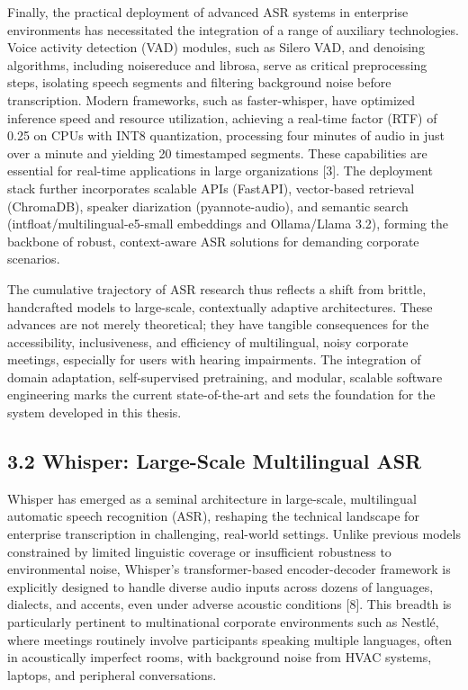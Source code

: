 \documentclass[12pt,a4paper]{article}
\begin{document}
Finally, the practical deployment of advanced ASR systems in enterprise environments has necessitated the integration of a range of auxiliary technologies. Voice activity detection (VAD) modules, such as Silero VAD, and denoising algorithms, including noisereduce and librosa, serve as critical preprocessing steps, isolating speech segments and filtering background noise before transcription. Modern frameworks, such as faster-whisper, have optimized inference speed and resource utilization, achieving a real-time factor (RTF) of 0.25 on CPUs with INT8 quantization, processing four minutes of audio in just over a minute and yielding 20 timestamped segments. These capabilities are essential for real-time applications in large organizations [3]. The deployment stack further incorporates scalable APIs (FastAPI), vector-based retrieval (ChromaDB), speaker diarization (pyannote-audio), and semantic search (intfloat/multilingual-e5-small embeddings and Ollama/Llama 3.2), forming the backbone of robust, context-aware ASR solutions for demanding corporate scenarios.


The cumulative trajectory of ASR research thus reflects a shift from brittle, handcrafted models to large-scale, contextually adaptive architectures. These advances are not merely theoretical; they have tangible consequences for the accessibility, inclusiveness, and efficiency of multilingual, noisy corporate meetings, especially for users with hearing impairments. The integration of domain adaptation, self-supervised pretraining, and modular, scalable software engineering marks the current state-of-the-art and sets the foundation for the system developed in this thesis.


\subsection{3.2 Whisper: Large-Scale Multilingual ASR}


Whisper has emerged as a seminal architecture in large-scale, multilingual automatic speech recognition (ASR), reshaping the technical landscape for enterprise transcription in challenging, real-world settings. Unlike previous models constrained by limited linguistic coverage or insufficient robustness to environmental noise, Whisper’s transformer-based encoder-decoder framework is explicitly designed to handle diverse audio inputs across dozens of languages, dialects, and accents, even under adverse acoustic conditions [8]. This breadth is particularly pertinent to multinational corporate environments such as Nestlé, where meetings routinely involve participants speaking multiple languages, often in acoustically imperfect rooms, with background noise from HVAC systems, laptops, and peripheral conversations.
\end{document}
